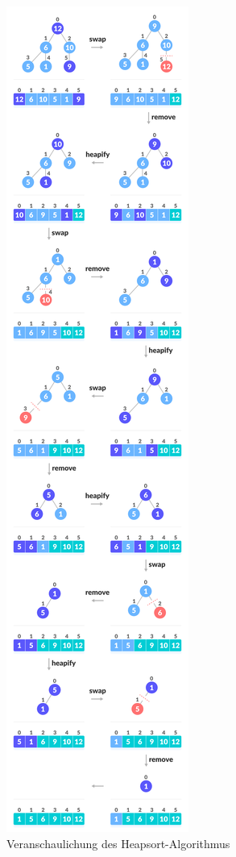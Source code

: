 \documentclass[a4paper]{article}
\begin{document}
    \begin{figure}[h]
        \centering
        \includegraphics[scale = 0.189]{Pictures/heap_sort.jpeg}
        \caption{Veranschaulichung des Heapsort-Algorithmus}
        \label{fig:heapsort with array}
    \end{figure}
\end{document}
